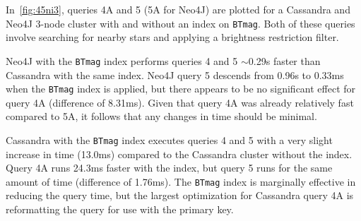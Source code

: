 In~\autoref{fig:45ni3}, queries 4A and 5 (5A for Neo4J) are plotted for a Cassandra and Neo4J 3-node cluster
with and without an index on \texttt{BTmag}.
Both of these queries involve searching for nearby stars and applying a brightness restriction filter.

Neo4J with the \texttt{BTmag} index performs queries 4 and 5 $\sim$0.29s faster than Cassandra with the same index.
Neo4J query 5 descends from 0.96s to 0.33ms when the \texttt{BTmag} index is applied, but there appears to be no
significant effect for query 4A (difference of 8.31ms).
Given that query 4A was already relatively fast compared to 5A, it follows that any changes in time should be
minimal.

Cassandra with the \texttt{BTmag} index executes queries 4 and 5 with a very slight increase in time (13.0ms) compared
to the Cassandra cluster without the index.
Query 4A runs 24.3ms faster with the index, but query 5 runs for the same amount of time (difference of 1.76ms).
The \texttt{BTmag} index is marginally effective in reducing the query time, but the largest optimization for
Cassandra query 4A is reformatting the query for use with the primary key.


